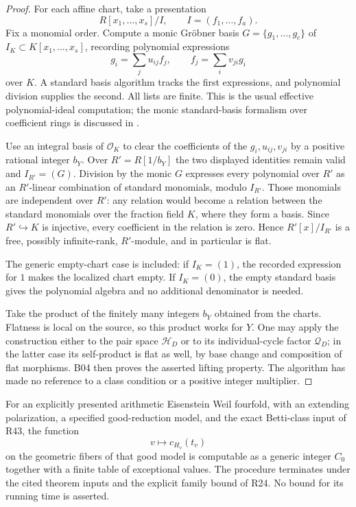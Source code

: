 \begin{proof}
For each affine chart, take a presentation
\[
 R[x_1,\ldots,x_s]/I,\qquad I=(f_1,\ldots,f_a).
\]
Fix a monomial order. Compute a monic Gr\"obner basis
$G=\{g_1,\ldots,g_c\}$ of $I_K\subset K[x_1,\ldots,x_s]$,
recording polynomial expressions
\[
 g_i=\sum_j u_{ij}f_j,\qquad
 f_j=\sum_i v_{ji}g_i
\]
over $K$. A standard basis algorithm tracks the first expressions,
and polynomial division supplies the second. All lists are finite.
This is the usual effective polynomial-ideal computation; the
monic standard-basis formalism over coefficient rings is discussed
in \cite[\S3, Definitions 3.8--3.10 and Propositions 3.11--3.13,
pp.~15--17; proof of Theorem 3.6, pp.~17--18]{HaimanSturmfels}.

Use an integral basis of $\mathcal O_K$ to clear the coefficients of
the $g_i,u_{ij},v_{ji}$ by a positive rational integer $b_Y$.
Over $R'=R[1/b_Y]$ the two displayed identities remain valid and
$I_{R'}=(G)$. Division by the monic $G$ expresses every polynomial
over $R'$ as an $R'$-linear combination of standard monomials,
modulo $I_{R'}$. Those monomials are independent over $R'$:
any relation would become a relation between the standard monomials
over the fraction field $K$, where they form a basis. Since
$R'\hookrightarrow K$ is injective, every coefficient in the relation
is zero. Hence $R'[x]/I_{R'}$ is a free, possibly infinite-rank,
$R'$-module, and in particular is flat.

The generic empty-chart case is included: if $I_K=(1)$, the recorded
expression for $1$ makes the localized chart empty. If $I_K=(0)$,
the empty standard basis gives the polynomial algebra and no additional
denominator is needed.

Take the product of the finitely many integers $b_Y$ obtained from the
charts. Flatness is local on the source, so this product works for $Y$.
One may apply the construction either to the pair space
$\mathcal H_D$ or to its individual-cycle factor $\mathcal Q_D$;
in the latter case its self-product is flat as well, by base change
and composition of flat morphisms. B04 then proves the asserted
lifting property. The algorithm has made no reference to a class
condition or a positive integer multiplier.
\end{proof}

\begin{corollary}
\label{cor:R45}
For an explicitly presented arithmetic Eisenstein Weil fourfold,
with an extending polarization, a specified good-reduction model,
and the exact Betti-class input of R43, the function
\[
                    v\longmapsto c_{H_v}(t_v)
\]
on the geometric fibers of that good model is computable as a generic
integer $C_0$ together with a finite table of exceptional values.
The procedure terminates under the cited theorem inputs and the
explicit family bound of R24. No bound for its running time is asserted.
\end{corollary}

